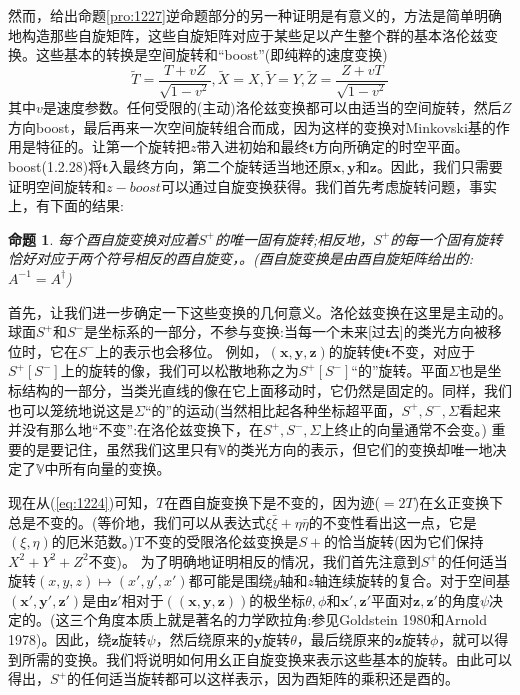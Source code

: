 \documentclass[utf8]{ctexbook}
\numberwithin{equation}{section}
\newtheorem{proposition}{命题}[chapter]
\begin{document}
然而，给出命题\ref{pro:1227}逆命题部分的另一种证明是有意义的，方法是简单明确地构造那些自旋矩阵，这些自旋矩阵对应于某些足以产生整个群的基本洛伦兹变换。这些基本的转换是空间旋转和“boost”(即纯粹的速度变换)
\begin{equation}
    \tilde{T} = \frac{T+vZ}{\sqrt{1-v^2}}, \tilde{X} = X,  \tilde{Y}=Y, \tilde{Z} = \frac{Z+vT}{\sqrt{1-v^2}}\label{eq:1228}
\end{equation}
其中$v$是速度参数。任何受限的(主动)洛伦兹变换都可以由适当的空间旋转，然后$Z$方向boost，最后再来一次空间旋转组合而成，因为这样的变换对Minkovski基的作用是特征的。让第一个旋转把$z$带入进初始和最终$\mathbf{t}$方向所确定的时空平面。boost(1.2.28)将$\mathbf{t}$入最终方向，第二个旋转适当地还原$\mathbf{x},\mathbf{y}$和$\mathbf{z}$。因此，我们只需要证明空间旋转和$z-boost$可以通过自旋变换获得。我们首先考虑旋转问题，事实上，有下面的结果:
\begin{proposition}
    每个酉自旋变换对应着$S^+$的唯一固有旋转;相反地，$S^+$的每一个固有旋转恰好对应于两个符号相反的酉自旋变，。(酉自旋变换是由酉自旋矩阵给出的:$A^{-1}=A^\dagger$)\label{pro:1229}
\end{proposition}

首先，让我们进一步确定一下这些变换的几何意义。洛伦兹变换在这里是主动的。球面$S^+$和$S^-$是坐标系的一部分，不参与变换:当每一个未来[过去]的类光方向被移位时，它在$S^-$上的表示也会移位。
例如，$\mathbf{(x, y, z)}$的旋转使$\mathbf{t}$不变，对应于$S^+[S^-]$上的旋转的像，我们可以松散地称之为$S^+[S^-]$“的”旋转。平面$\Sigma$也是坐标结构的一部分，当类光直线的像在它上面移动时，它仍然是固定的。同样，我们也可以笼统地说这是$\Sigma$“的”的运动(当然相比起各种坐标超平面，$S^+,S^-,\Sigma$看起来并没有那么地“不变”:在洛伦兹变换下，在$S^+,S^-,\Sigma$上终止的向量通常不会变。)
重要的是要记住，虽然我们这里只有$\mathbb{V}$的类光方向的表示，但它们的变换却唯一地决定了$\mathbb{V}$中所有向量的变换。

现在从(\ref{eq:1224})可知，$T$在酉自旋变换下是不变的，因为迹($=2T$)在幺正变换下总是不变的。(等价地，我们可以从表达式$\xi\bar{\xi}+\eta\bar{\eta}$的不变性看出这一点，它是$(\xi,\eta)$的厄米范数。)T不变的受限洛伦兹变换是$S+$的恰当旋转(因为它们保持$X^2 + Y^2 + Z^2$不变)。
为了明确地证明相反的情况，我们首先注意到$S^+$的任何适当旋转$(x,y,z)\mapsto(x',y',x')$都可能是围绕$y$轴和$z$轴连续旋转的复合。对于空间基$(\mathbf{x', y',z'})$是由$\mathbf{z'}$相对于$(\mathbf{(x,y,z)})$的极坐标$\theta,\phi$和$\mathbf{x', z'}$平面对$\mathbf{z, z'}$的角度$\psi$决定的。(这三个角度本质上就是著名的力学欧拉角:参见Goldstein 1980和Arnold 1978)。因此，绕$\mathbf{z}$旋转$\psi$，然后绕原来的$\mathbf{y}$旋转$\theta$，最后绕原来的$\mathbf{z}$旋转$\phi$，就可以得到所需的变换。我们将说明如何用幺正自旋变换来表示这些基本的旋转。由此可以得出，$S^+$的任何适当旋转都可以这样表示，因为酉矩阵的乘积还是酉的。
\end{document}
